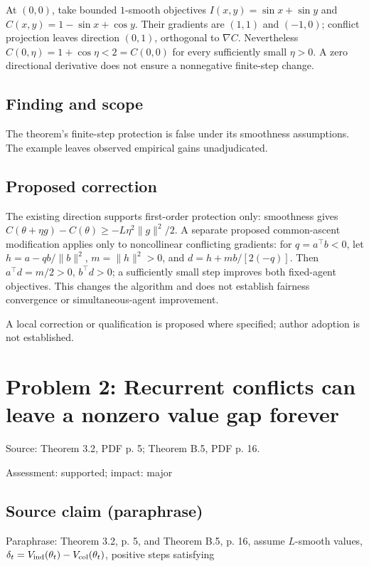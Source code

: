\documentclass[11pt]{article}
\begin{document}
At \((0,0)\), take bounded \(1\)-smooth objectives \(I(x,y)=\sin x+\sin y\) and \(C(x,y)=1-\sin x+\cos y\). Their gradients are \((1,1)\) and \((-1,0)\); conflict projection leaves direction \((0,1)\), orthogonal to \(\nabla C\). Nevertheless \(C(0,\eta)=1+\cos\eta<2=C(0,0)\) for every sufficiently small \(\eta>0\). A zero directional derivative does not ensure a nonnegative finite-step change.

\subsection*{Finding and scope}

The theorem's finite-step protection is false under its smoothness assumptions. The example leaves observed empirical gains unadjudicated.

\subsection*{Proposed correction}

The existing direction supports first-order protection only: smoothness gives \(C(\theta+\eta g)-C(\theta)\geq-L\eta^2\|g\|^2/2\). A separate proposed common-ascent modification applies only to noncollinear conflicting gradients: for \(q=a^\top b<0\), let \(h=a-qb/\|b\|^2\), \(m=\|h\|^2>0\), and \(d=h+mb/[2(-q)]\). Then \(a^\top d=m/2>0\), \(b^\top d>0\); a sufficiently small step improves both fixed-agent objectives. This changes the algorithm and does not establish fairness convergence or simultaneous-agent improvement.

A local correction or qualification is proposed where specified; author adoption is not established.

\section*{Problem 2: Recurrent conflicts can leave a nonzero value gap forever}

Source: Theorem 3.2, PDF p. 5; Theorem B.5, PDF p. 16.

Assessment: supported; impact: major

\subsection*{Source claim (paraphrase)}

Paraphrase: Theorem 3.2, p. 5, and Theorem B.5, p. 16, assume \(L\)-smooth values, \(\delta_t=V_{\rm ind}(\theta_t)-V_{\rm col}(\theta_t)\), positive steps satisfying
\end{document}
